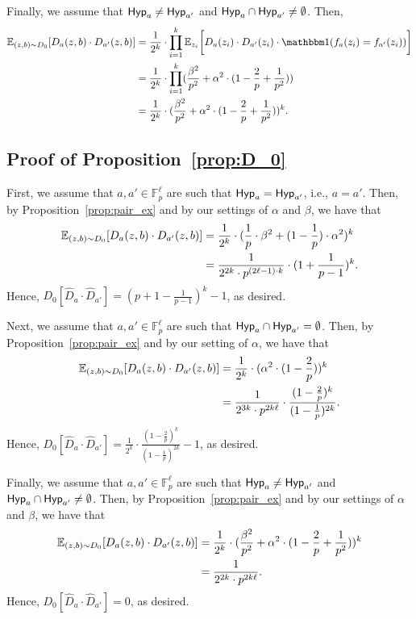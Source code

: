 	Finally, we assume that $\mathsf{Hyp}_a \neq \mathsf{Hyp}_{a'}$ and $\mathsf{Hyp}_a \cap \mathsf{Hyp}_{a'} \neq \emptyset$. Then,
	\begin{align*}
	\Ex_{(z,b) \sim D_0}[D_a(z,b) \cdot D_{a'}(z,b)] &= \frac{1}{2^k} \cdot \displaystyle\prod\limits_{i = 1}^k \Ex_{z_i}\bigg[D_a(z_i) \cdot D_{a'}(z_i) \cdot \ind(f_a(z_i) = f_{a'}(z_i)) \bigg]\\
	&=  \frac{1}{2^k} \cdot \displaystyle\prod\limits_{i = 1}^k ( \frac{\beta^2}{p^2} +\alpha^2 \cdot (1-\frac{2}{p}+\frac{1}{p^2}))\\
	&= \frac{1}{2^k} \cdot ( \frac{\beta^2}{p^2} +\alpha^2 \cdot (1-\frac{2}{p}+\frac{1}{p^2}))^k.
	\end{align*}
	
\subsection{Proof of Proposition~\ref{prop:D_0}}

	First, we assume that $a, a' \in \mathbb{F}_p^{\ell}$ are such that $\mathsf{Hyp}_a = \mathsf{Hyp}_{a'}$, i.e., $a = a'$. Then, by Proposition~\ref{prop:pair_ex} and by our settings of $\alpha$ and $\beta$, we have that
	\begin{align*}
	\mathbb E_{(z,b) \sim D_0}[D_a(z,b) \cdot D_{a'}(z,b)] &= \frac{1}{2^k} \cdot (\frac{1}{p} \cdot \beta^2 + (1-\frac{1}{p}) \cdot \alpha^2)^k\\
	&= \frac{1}{2^{2k} \cdot p^{(2\ell-1)\cdot k}} \cdot (1+\frac{1}{p-1})^k.
	\end{align*}
	Hence, $D_0[\hat{D}_a \cdot \hat{D}_{a'}] = (p+1-\frac{1}{p-1})^k - 1$, as desired.
	
	Next, we assume that $a, a' \in \mathbb{F}_p^{\ell}$ are such that $\mathsf{Hyp}_a \cap \mathsf{Hyp}_{a'} = \emptyset$. Then, by Proposition~\ref{prop:pair_ex} and by our setting of $\alpha$, we have that
	\begin{align*}
	\mathbb E_{(z,b) \sim D_0}[D_a(z,b) \cdot D_{a'}(z,b)] &= \frac{1}{2^k}\cdot (\alpha^2 \cdot (1-\frac{2}{p}))^k\\
	&= \frac{1}{2^{3k} \cdot p^{2 k \ell}} \cdot \frac{(1-\frac{2}{p})^k}{(1-\frac{1}{p})^{2k}}.
	\end{align*}
	Hence, $D_0[\hat{D}_a \cdot \hat{D}_{a'}] = \frac{1}{2^k} \cdot \frac{(1-\frac{2}{p})^k}{(1-\frac{1}{p})^{2k}}-1$, as desired.
	
	Finally, we assume that $a, a' \in \mathbb{F}_p^{\ell}$ are such that $\mathsf{Hyp}_a \neq \mathsf{Hyp}_{a'}$ and $\mathsf{Hyp}_a \cap \mathsf{Hyp}_{a'} \neq \emptyset$. Then, by Proposition~\ref{prop:pair_ex} and by our settings of $\alpha$ and $\beta$, we have that
	\begin{align*}
	\mathbb E_{(z,b) \sim D_0}[D_a(z,b) \cdot D_{a'}(z,b)] &= \frac{1}{2^k} \cdot ( \frac{\beta^2}{p^2} +\alpha^2 \cdot (1-\frac{2}{p}+\frac{1}{p^2}))^k\\
	&= \frac{1}{2^{2k} \cdot p^{2 k \ell}}.
	\end{align*}
	Hence, $D_0[\hat{D}_a \cdot \hat{D}_{a'}] = 0$, as desired.
